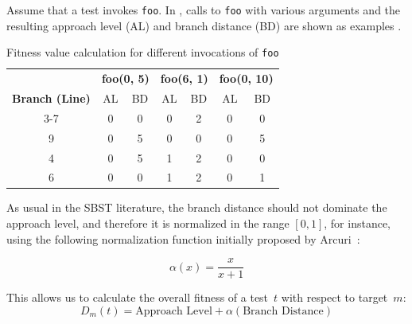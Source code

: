 \documentclass[paper=a4,%
  twoside,%
  BCOR4mm,%
  abstract=true,%
  toc=bibliography,%
  chapterprefix=true,%
  toc=bibliographynumbered,%
  open=right,%
  english,%
  pagesize=pdftex]{scrreprt}
\begin{document}
Assume that a test invokes \texttt{foo}. In , calls to \texttt{foo} with various arguments and the resulting approach level (AL) and branch distance (BD) are shown as examples .
\begin{table}[h!]
\centering
\begin{tabular}{c|cc|cc|cc}
\hline
& \multicolumn{2}{c|}{\textbf{foo(0, 5)}}                     & \multicolumn{2}{c|}{\textbf{foo(6, 1)}}                      & \multicolumn{2}{c}{\textbf{foo(0, 10)}}                     \\
\cline{2-7}
\textbf{Branch (Line)} & AL & BD & AL & BD & AL & BD \\
\hline
3-7                    & 0                       & 0                        & 0                       & 2                        & 0                       & 0                        \\
9                      & 0                       & 5                        & 0                       & 0                        & 0                       & 5                        \\
4                      & 0                       & 5                        & 1                       & 2                        & 0                       & 0                        \\
6                      & 0                       & 0                        & 1                       & 2                        & 0                       & 1 \\ \hline
\end{tabular}
\caption{Fitness value calculation for different invocations of \texttt{foo}}
\label{tab:example-fitness-calculation}
\end{table}

As usual in the \ac{SBST} literature, the branch distance should not dominate the approach level, and therefore it is normalized in the range $[0, 1]$, for instance, using the following normalization function initially proposed by Arcuri~\cite{Arcuri_2011}:

\[\alpha(x) = \frac{x}{x + 1}\]

This allows us to calculate the overall fitness of a test~$t$ with respect to target~$m$:
\[D_m(t) = \text{Approach Level} + \alpha(\text{Branch Distance})\]

\end{document}
